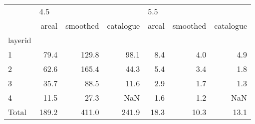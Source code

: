 \begin{tabular}{lrrrrrr}
\toprule
{} & \multicolumn{3}{l}{4.5} & \multicolumn{3}{l}{5.5} \\
{} &  areal & smoothed & catalogue & areal & smoothed & catalogue \\
layerid &        &          &           &       &          &           \\
\midrule
1       &   79.4 &    129.8 &      98.1 &   8.4 &      4.0 &       4.9 \\
2       &   62.6 &    165.4 &      44.3 &   5.4 &      3.4 &       1.8 \\
3       &   35.7 &     88.5 &      11.6 &   2.9 &      1.7 &       1.3 \\
4       &   11.5 &     27.3 &       NaN &   1.6 &      1.2 &       NaN \\
Total   &  189.2 &    411.0 &     241.9 &  18.3 &     10.3 &      13.1 \\
\bottomrule
\end{tabular}
